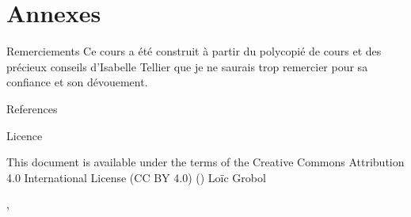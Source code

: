 \documentclass[hyperref={unicode}, xcolor={svgnames}]{beamer}
\begin{document}

\appendix
{}  %
\section{Annexes}
\begin{frame}{Remerciements}
    Ce cours a été construit à partir du polycopié de cours  \parencite{tellier2017fouille} et des précieux conseils d'Isabelle Tellier que je ne saurais trop remercier pour sa confiance et son dévouement.
\end{frame}

\begin{frame}[allowframebreaks]{References}
    \printbibliography[heading=none]
\end{frame}

\begin{frame}{Licence}
    \begin{center}
        {\huge \ccby}
        \vfill
        This document is available under the terms of the Creative Commons Attribution 4.0 International License (CC BY 4.0) ()
        \vfill
        Loïc Grobol

        , 
    \end{center}
\end{frame}
\end{document}
